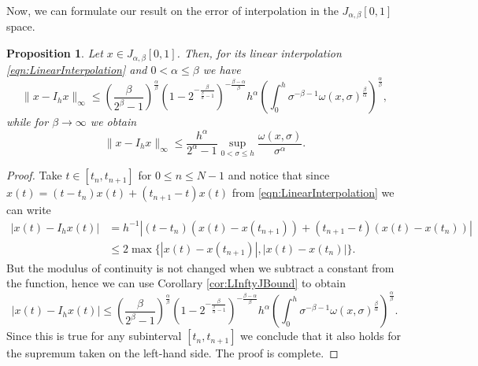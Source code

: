 \documentclass[12pt,a4paper]{article}
\newtheorem{prop}{Proposition}
\begin{document}
Now, we can formulate our result on the error of interpolation in the $J_{\alpha,\beta}[0,1]$ space. 
\begin{prop}\label{prop:LInftyJInterpolation}
	Let $x \in J_{\alpha,\beta}[0,1]$. Then, for its linear interpolation \eqref{eqn:LinearInterpolation} and $0<\alpha\leq \beta$ we have
	\begin{equation}
		\|x - I_h x\|_\infty \leq \left(\frac{\beta}{2^{\beta}-1}\right)^\frac{\alpha}{\beta} \left(1-2^{-\frac{\beta}{\frac{\beta}{\alpha}-1}}\right)^{-\frac{\beta - \alpha}{\beta}}h^\alpha \left(\int_0^h \sigma^{-\beta-1} \omega(x,\sigma)^\frac{\beta}{\alpha}\right)^\frac{\alpha}{\beta},
	\end{equation}
	while for $\beta\rightarrow\infty$ we obtain
	\begin{equation}
		\|x-I_h x\|_\infty \leq \frac{h^\alpha}{2^{\alpha}-1} \sup_{0<\sigma\leq h}\frac{\omega(x,\sigma)}{\sigma^\alpha}.
	\end{equation}
\end{prop}
\begin{proof}
	Take $t\in [t_n, t_{n+1}]$ for $0\leq n\leq N-1$ and notice that since $x(t) = (t-t_n)x(t) + (t_{n+1}-t)x(t)$ from \eqref{eqn:LinearInterpolation} we can write
	\begin{equation}
		\begin{split}
			|x(t) - I_h x(t)| 
			&= h^{-1}\left|(t-t_n)(x(t)-x(t_{n+1})) + (t_{n+1}-t) (x(t) - x(t_n))\right| \\
			&\leq 2\max\{|x(t)-x(t_{n+1})|, |x(t) - x(t_n)|\}.
		\end{split}
	\end{equation}
	But the modulus of continuity is not changed when we subtract a constant from the function, hence we can use Corollary \ref{cor:LInftyJBound} to obtain
	\begin{equation}
		|x(t) - I_h x(t)| \leq \left(\frac{\beta}{2^{\beta}-1}\right)^\frac{\alpha}{\beta} \left(1-2^{-\frac{\beta}{\frac{\beta}{\alpha}-1}}\right)^{-\frac{\beta - \alpha}{\beta}}h^\alpha \left(\int_0^h \sigma^{-\beta-1} \omega(x,\sigma)^\frac{\beta}{\alpha}\right)^\frac{\alpha}{\beta}.
	\end{equation}
	Since this is true for any subinterval $[t_n, t_{n+1}]$ we conclude that it also holds for the supremum taken on the left-hand side. The proof is complete. 
\end{proof}
\end{document}
